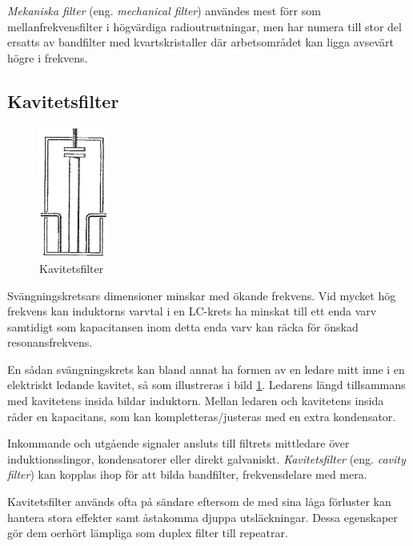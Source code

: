 \emph{Mekaniska filter} (eng. \emph{mechanical filter}) användes mest förr som
mellanfrekvensfilter i högvärdiga radioutrustningar, men har numera till stor
del ersatts av bandfilter med kvartskristaller där arbetsområdet kan ligga
avsevärt högre i frekvens.

\subsection{Kavitetsfilter}

\begin{figure}
  \includegraphics[width=0.2\textwidth]{images/cropped_pdfs/bild_2_3-31.pdf}
  \caption{Kavitetsfilter}
  \label{fig:BildII3-31}
\end{figure}

Svängningskretsars dimensioner minskar med ökande frekvens.
Vid mycket hög frekvens kan induktorns varvtal i en LC-krets ha minskat till
ett enda varv samtidigt som kapacitansen inom detta enda varv kan räcka för
önskad resonansfrekvens.

En sådan svängningskrets kan bland annat ha formen av en ledare mitt inne i en
elektriskt ledande kavitet, så som illustreras i bild \ref{fig:BildII3-31}.
Ledarens längd tillsammans med kavitetens insida bildar induktorn.
Mellan ledaren och kavitetens insida råder en kapacitans, som kan
kompletteras/justeras med en extra kondensator.

Inkommande och utgående signaler ansluts till filtrets mittledare över
induktionsslingor, kondensatorer eller direkt galvaniskt.
\emph{Kavitetsfilter} (eng. \emph{cavity filter}) kan kopplas ihop för att
bilda bandfilter, frekvensdelare med mera.

Kavitetsfilter används ofta på sändare eftersom de med sina låga förluster kan
hantera stora effekter samt åstakomma djuppa utsläckningar.
Dessa egenskaper gör dem oerhört lämpliga som duplex filter till repeatrar.

